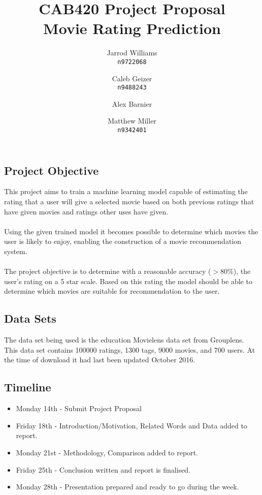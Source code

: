 \documentclass[]{report}   %
\begin{document}
\title{CAB420 Project Proposal \\ \large{Movie Rating Prediction}}   %
\author{
	Jarrod Williams\\
	\texttt{n9722068}
	\and 
	Caleb Geizer\\
	\texttt{n9488243}
	\and
	Alex Barnier\\
	\texttt{}
	\and	
	Matthew Miller\\
	\texttt{n9342401}
}
\maketitle

\subsection*{Project Objective}
This project aims to train a machine learning model capable of estimating the rating that a user will give a selected movie based on both previous ratings that have given movies and ratings other uses have given. 
\\~\\
Using the given trained model it becomes possible to determine which movies the user is likely to enjoy, enabling the construction of a movie recommendation system.
\\~\\
The project objective is to determine with a reasonable accuracy ($>$80\%), the user's rating on a 5 star scale. Based on this rating the model should be able to determine which movies are suitable for recommendation to the user.
\subsection*{Data Sets}
The data set being used is the education Movielens data set from Grouplens. This data set contains 100000 ratings, 1300 tags, 9000 movies, and 700 users. At the time of download it had last been updated October 2016.

\subsection*{Timeline}
\begin{itemize}
  \item Monday 14th - Submit Project Proposal 
  \item Friday 18th - Introduction/Motivation, Related Words and Data added to report.
  \item Monday 21st - Methodology, Comparison added to report.
  \item Friday 25th - Conclusion written and report is finalised.
  \item Monday 28th - Presentation prepared and ready to go during the week.
\end{itemize}
\end{document}
